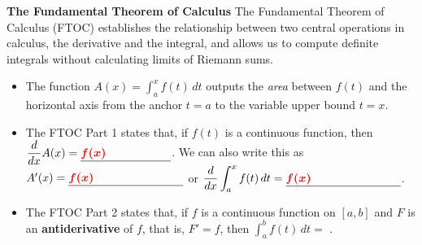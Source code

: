 \documentclass{article}
\begin{document}
  \vfill 
  \newpage
  \begin{framed}
  \vspace{0.05in}
   \textbf{The Fundamental Theorem of Calculus} The Fundamental Theorem of Calculus (FTOC) establishes the relationship between two central operations in calculus, the derivative and the integral, and allows us to compute definite integrals without calculating limits of Riemann sums.
  \begin{itemize}
  \item The function $A(x) = \displaystyle \int_a^x
  f(t)\,dt$ outputs the \textit{area} 
  between $f(t)$ and the horizontal axis from the \newline
      \vfill
      anchor $t=a$ to the variable upper bound $t=x$.
      \item The FTOC Part 1 states that, if $f(t)$ is a continuous function, then $\dfrac{d}{dx}A(x) = \fitb{1.1in}{\textcolor{red}{f(x)}}$.\newline
      \vfill
      We can also write this as $A'(x)=\fitb{1.4in}{\textcolor{red}{f(x)}}$ or $\dfrac{d}{dx}\displaystyle \int_a^x
  f(t)\,dt = \fitb{1.4in}{\textcolor{red}{f(x)}}$.
      \newline
      \vfill
      \item The FTOC Part 2 states that, if $f$ is
  a continuous function on $[a, b]$ and $F$ is an \textbf{antiderivative} of \newline \vfill  $f$,
  that is, $F'=f$, then $\displaystyle \int_a^b f(t)\,dt
  = {}$ \fitb{3.6in}{$\bm{\textcolor{red}{F(b)-F(a)}}$}. 
  \vfill
  \end{itemize}
  \end{framed}
  \vfill 
\end{document}
